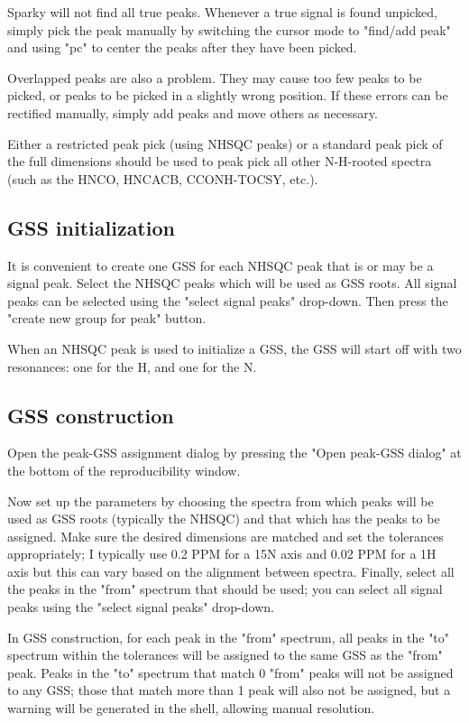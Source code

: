 Sparky will not find all true peaks.  Whenever a true signal is found 
unpicked, simply pick the peak manually by switching the cursor mode to 
"find/add peak" and using "pc" to center the peaks after they have been
picked.

Overlapped peaks are also a problem.  They may cause too few peaks to be 
picked, or peaks to be picked in a slightly wrong position.  If these errors
can be rectified manually, simply add peaks and move others as necessary.

Either a restricted peak pick (using NHSQC peaks) or a standard peak pick
of the full dimensions should be used to peak pick all other N-H-rooted
spectra (such as the HNCO, HNCACB, CCONH-TOCSY, etc.).

\subsection*{GSS initialization}
It is convenient to create one GSS for each NHSQC peak that is or may be
a signal peak.  Select the NHSQC peaks which will be used as GSS roots.  
All signal peaks can be selected using the "select signal peaks" drop-down.
Then press the "create new group for peak" button.

When an NHSQC peak is used to initialize a GSS, the GSS will start off
with two resonances: one for the H, and one for the N.

\subsection*{GSS construction}
Open the peak-GSS assignment dialog by pressing the "Open peak-GSS dialog"
at the bottom of the reproducibility window.

Now set up the parameters by choosing the spectra from which peaks will
be used as GSS roots (typically the NHSQC) and that which has the peaks to
be assigned.  Make sure the desired dimensions are matched and set the 
tolerances appropriately; I typically use 0.2 PPM for a 15N axis and 0.02 PPM
for a 1H axis but this can vary based on the alignment between spectra.
Finally, select all the peaks in the "from" spectrum that should be used;
you can select all signal peaks using the "select signal peaks" drop-down.

In GSS construction, for each peak in the "from"
spectrum, all peaks in the "to" spectrum within the tolerances will be
assigned to the same GSS as the "from" peak.  Peaks in the "to" spectrum that
match 0 "from" peaks will not be assigned to any GSS; those that match more
than 1 peak will also not be assigned, but a warning will be generated in
the shell, allowing manual resolution.

